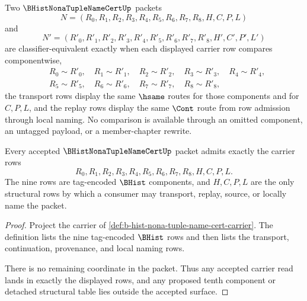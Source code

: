 \begin{definition}
\label{def:b-hist-nona-tuple-name-cert-classifier}
Two $\BHistNonaTupleNameCertUp$ packets
$$
N=(R_0,R_1,R_2,R_3,R_4,R_5,R_6,R_7,R_8,H,C,P,L)
$$
and
$$
N'=(R'_0,R'_1,R'_2,R'_3,R'_4,R'_5,R'_6,R'_7,R'_8,H',C',P',L')
$$
are classifier-equivalent exactly when each displayed carrier row compares componentwise,
$$
\begin{aligned}
&R_0 \sim R'_0,\quad R_1 \sim R'_1,\quad R_2 \sim R'_2,\quad R_3 \sim R'_3,\quad R_4 \sim R'_4,\\
&R_5 \sim R'_5,\quad R_6 \sim R'_6,\quad R_7 \sim R'_7,\quad R_8 \sim R'_8,
\end{aligned}
$$
the transport rows display the same $\hsame$ routes for those components and for $C,P,L$, and the replay rows display the same $\Cont$ route from row admission through local naming. No comparison is available through an omitted component, an untagged payload, or a member-chapter rewrite.
\end{definition}

\begin{theorem}
\label{thm:b-hist-nona-tuple-name-cert-carrier-admission}
Every accepted $\BHistNonaTupleNameCertUp$ packet admits exactly the carrier rows
$$
R_0,R_1,R_2,R_3,R_4,R_5,R_6,R_7,R_8,H,C,P,L.
$$
The nine rows are tag-encoded $\BHist$ components, and $H,C,P,L$ are the only structural rows by which a consumer may transport, replay, source, or locally name the packet.
\end{theorem}
\begin{proof}
Project the carrier of \autoref{def:b-hist-nona-tuple-name-cert-carrier}. The definition lists the nine tag-encoded $\BHist$ rows and then lists the transport, continuation, provenance, and local naming rows.

There is no remaining coordinate in the packet. Thus any accepted carrier read lands in exactly the displayed rows, and any proposed tenth component or detached structural table lies outside the accepted surface.
\end{proof}

